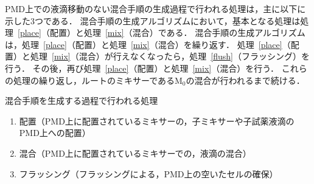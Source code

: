 PMD上での液滴移動のない混合手順の生成過程で行われる処理は，主に以下に示した3つである．
混合手順の生成アルゴリズムにおいて，基本となる処理は処理~\ref{place}（配置）と処理~\ref{mix}（混合）である．
混合手順の生成アルゴリズムは，処理~\ref{place}（配置）と処理~\ref{mix}（混合）を繰り返す．
処理~\ref{place}（配置）と処理~\ref{mix}（混合）が行えなくなったら，処理~\ref{flush}（フラッシング）を行う．
その後，再び処理~\ref{place}（配置）と処理~\ref{mix}（混合）を行う．
これらの処理の繰り返し，ルートのミキサーであるM$_0$の混合が行われるまで続ける．

\begin{itembox}[l]{混合手順を生成する過程で行われる処理}
\begin{enumerate}
    \item 配置（PMD上に配置されているミキサーの，子ミキサーや子試薬液滴のPMD上への配置）\label{place}
    \item 混合（PMD上に配置されているミキサーでの，液滴の混合）\label{mix}
    \item フラッシング（フラッシングによる，PMD上の空いたセルの確保）\label{flush}
\end{enumerate}
\end{itembox}


